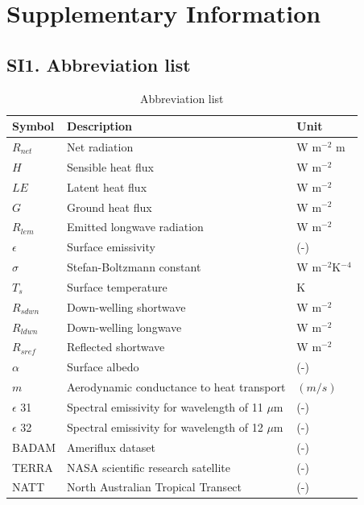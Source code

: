 \documentclass[fleqn,10pt]{wlscirep}
\begin{document}
{{%

%



%

\section{Supplementary Information}
\subsection*{SI1. Abbreviation list}
\begin{table}[h!]

\centering
\caption{Abbreviation list}
\begin{tabular}{p{2.5cm} p{4.0cm} p{3.0cm}}

\hline

Symbol & Description & Unit\\

\hline
$R_{net}$ & Net radiation & W m$^{-2}$ m \\
$H$ & Sensible heat flux & W m$^{-2}$ \\
$LE$ & Latent heat flux & W m$^{-2}$ \\
$G$ & Ground heat flux & W m$^{-2}$ \\
$R_{lem}$ & Emitted longwave radiation & W m$^{-2}$ \\
$\epsilon$ & Surface emissivity & (-)\\
$\sigma$ & Stefan-Boltzmann constant & W m$^{-2}$K$^{-4}$\\
$T_{s}$ & Surface temperature & K\\
$R_{sdwn}$ & Down-welling shortwave & W m$^{-2}$\\
$R_{ldwn}$ & Down-welling longwave & W m$^{-2}$\\
$R_{sref}$ & Reflected shortwave & W m$^{-2}$\\
$\alpha$ & Surface albedo & (-)\\
$m$ & Aerodynamic conductance to heat transport & $(m/s)$\\
$\epsilon$ 31 & Spectral emissivity for wavelength of 11 $\mu$m & (-) \\
$\epsilon$ 32 & Spectral emissivity for wavelength of 12 $\mu$m & (-)  \\
BADAM & Ameriflux dataset & (-) \\
TERRA & NASA scientific research satellite & (-)  \\
NATT & North Australian Tropical Transect & (-) \\


\end{tabular}
\end{table}}}
\end{document}
